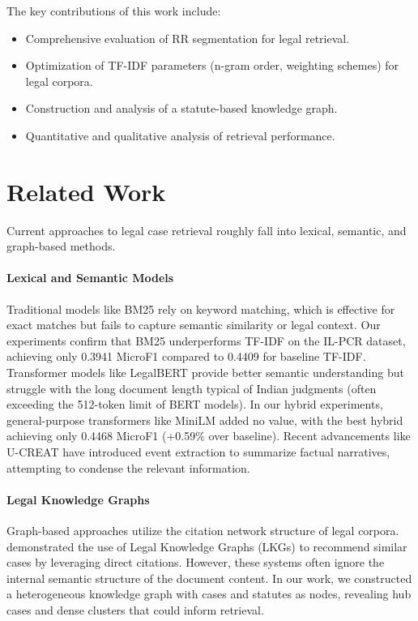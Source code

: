 \documentclass[11pt]{article}
\begin{document}
The key contributions of this work include:
\begin{itemize}
    \item Comprehensive evaluation of RR segmentation for legal retrieval.
    \item Optimization of TF-IDF parameters (n-gram order, weighting schemes) for legal corpora.
    \item Construction and analysis of a statute-based knowledge graph.
    \item Quantitative and qualitative analysis of retrieval performance.
\end{itemize}

\section{Related Work}

Current approaches to legal case retrieval roughly fall into lexical, semantic, and graph-based methods.

\paragraph{Lexical and Semantic Models}
Traditional models like BM25 rely on keyword matching, which is effective for exact matches but fails to capture semantic similarity or legal context. Our experiments confirm that BM25 underperforms TF-IDF on the IL-PCR dataset, achieving only 0.3941 MicroF1 compared to 0.4409 for baseline TF-IDF. Transformer models like LegalBERT provide better semantic understanding but struggle with the long document length typical of Indian judgments (often exceeding the 512-token limit of BERT models). In our hybrid experiments, general-purpose transformers like MiniLM added no value, with the best hybrid achieving only 0.4468 MicroF1 (+0.59\% over baseline). Recent advancements like U-CREAT \citep{joshi2023ucreat} have introduced event extraction to summarize factual narratives, attempting to condense the relevant information.

\paragraph{Legal Knowledge Graphs}
Graph-based approaches utilize the citation network structure of legal corpora. \citet{dhani2023similar} demonstrated the use of Legal Knowledge Graphs (LKGs) to recommend similar cases by leveraging direct citations. However, these systems often ignore the internal semantic structure of the document content. In our work, we constructed a heterogeneous knowledge graph with cases and statutes as nodes, revealing hub cases and dense clusters that could inform retrieval.
\end{document}
